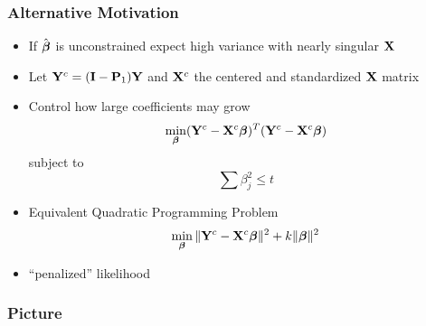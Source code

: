 \documentclass[]{beamer}\usepackage[]{graphicx}\usepackage[]{color}
\begin{document}
\begin{frame}  \frametitle{Alternative Motivation}
  \begin{itemize}
  \item If  $\hat{\boldsymbol{\beta}}$ is unconstrained  expect high variance with nearly
    singular $\mathbf{X}$ \pause
  \item Let $\mathbf{Y}^c = (\mathbf{I} - \mathbf{P}_1) \mathbf{Y}$  and $\mathbf{X}^c$ the centered and
    standardized  $\mathbf{X}$ matrix \pause
\item Control how large coefficients may grow \pause
    $$\min_{\boldsymbol{\beta}} (\mathbf{Y}^c - \mathbf{X}^c \boldsymbol{\beta})^T (\mathbf{Y}^c - \mathbf{X}^c\boldsymbol{\beta})$$
    subject to
    $$ \sum \beta_j^2 \le t$$ \pause
  \item Equivalent Quadratic Programming Problem
    $$\min_{\boldsymbol{\beta}} \| \mathbf{Y}^c - \mathbf{X}^c \boldsymbol{\beta}\|^2 + k \|\boldsymbol{\beta}\|^2$$ \pause
  \item ``penalized'' likelihood \pause
  \end{itemize}
\end{frame}
\begin{frame}\frametitle{Picture}

\end{frame}
\end{document}
